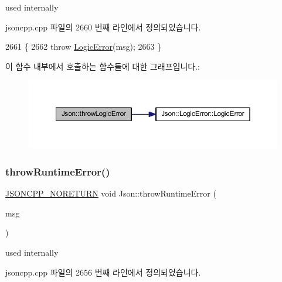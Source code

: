 used internally 



jsoncpp.\+cpp 파일의 2660 번째 라인에서 정의되었습니다.


\begin{DoxyCode}
2661 \{
2662   \textcolor{keywordflow}{throw} \hyperlink{class_json_1_1_logic_error}{LogicError}(msg);
2663 \}
\end{DoxyCode}
이 함수 내부에서 호출하는 함수들에 대한 그래프입니다.\+:\nopagebreak
\begin{figure}[H]
\begin{center}
\leavevmode
\includegraphics[width=350pt]{namespace_json_a27790f21f17922fac81e7cd72a5659a5_cgraph}
\end{center}
\end{figure}
\mbox{\label{namespace_json_a0ab7ff7f99788262d92d9ff3d924e065}} 
\subsubsection{\texorpdfstring{throw\+Runtime\+Error()}{throwRuntimeError()}}
{\footnotesize\ttfamily \hyperlink{json_8h_a78c5ba441d8b48f24a5095b97f01f282}{J\+S\+O\+N\+C\+P\+P\+\_\+\+N\+O\+R\+E\+T\+U\+RN} void Json\+::throw\+Runtime\+Error (\begin{DoxyParamCaption}\item[{\hyperlink{json_8h_a1e723f95759de062585bc4a8fd3fa4be}{J\+S\+O\+N\+C\+P\+P\+\_\+\+S\+T\+R\+I\+NG} const \&}]{msg }\end{DoxyParamCaption})}



used internally 



jsoncpp.\+cpp 파일의 2656 번째 라인에서 정의되었습니다.


